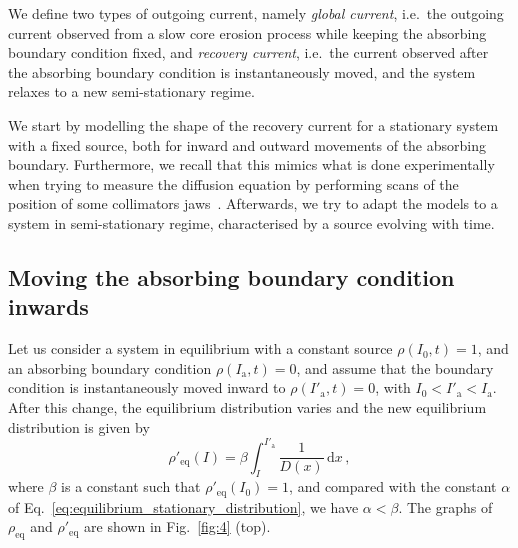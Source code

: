 {We define two types of outgoing current, namely \textsl{global current}, i.e.\ the outgoing current observed from a slow core erosion process while keeping the absorbing boundary condition fixed, and \textsl{recovery current}, i.e.\ the current observed after the absorbing boundary condition is instantaneously moved, and the system relaxes to a new semi-stationary regime.

We start by modelling the shape of the recovery current for a stationary system with a fixed source, both for inward and outward movements of the absorbing boundary. Furthermore, we recall that this mimics what is done experimentally when trying to measure the diffusion equation by performing scans of the position of some collimators jaws~{\cite{MESS1994279,flilleriii:pac03-rpag004,stancari2011diffusion,stancari:ipac11-tupz033,Stancari:1637929,PhysRevSTAB.16.021003,PhysRevAccelBeams.23.044802}}. Afterwards, we try to adapt the models to a system in semi-stationary regime, characterised by a source evolving with time.


\subsection{Moving the absorbing boundary condition inwards}


Let us consider a system in equilibrium with a constant  source $\rho(I_0, t)=1$, and an absorbing boundary condition $\rho(I_\mathrm{a}, t)=0$, and assume that the boundary condition is instantaneously moved inward to $\rho(I'_\mathrm{a}, t)=0$, with $I_0 < I'_\mathrm{a} < I_\mathrm{a}$. After this change, the equilibrium distribution varies and the new equilibrium distribution is given by
\begin{equation}
    \rho'_\text{eq}(I) = \beta \int_I^{I'_\mathrm{a}} \frac{1}{D(x)}\,\mathrm{d}x\,,
\end{equation}
where $\beta$ is a constant such that $\rho'_\text{eq}(I_0)=1$, and compared with the constant $\alpha$ of Eq.~\eqref{eq:equilibrium_stationary_distribution}, we have $\alpha < \beta$. The graphs of $\rho_\mathrm{eq}$ and $\rho'_\mathrm{eq}$ are shown in Fig.~\ref{fig:4} (top).

}
